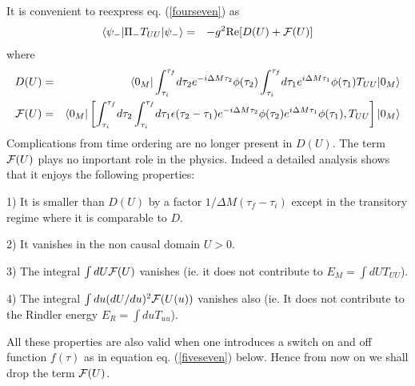 \documentclass[12pt,oneside]{report}
\def\elematrice#1#2#3{\langle #1|#2|#3 \rangle}
\begin{document}
It is convenient to reexpress  eq. (\ref{fourseven}) as
 \begin{eqnarray}
\elematrice{\psi_-} {\Pi_- T_{UU} }{\psi_-}
&=& 
- g^2 {\rm Re} [ D(U) + {\cal F}(U) ]
\label{fff}\end{eqnarray}
where
\begin{eqnarray}
 D(U)&=&
 \elematrice {0_M} { \int_{\tau_i}^{\tau_f} \! d\tau_2
e^{ -i \Delta M \tau_2} \phi(\tau_2) 
\int_{\tau_i}^{\tau_f} \! d\tau_1
e^{i \Delta M \tau_1} \phi(\tau_1)  T_{UU}}{0_M} \nonumber\\
{\cal F}(U)&=& 
\elematrice {0_M} { \left[ \int_{\tau_i}^{\tau_f} \! d\tau_2 
\int_{\tau_i}^{\tau_f} \! d\tau_1 \epsilon(\tau_2 - \tau_1)
e^{ -i \Delta M \tau_2} \phi(\tau_2) 
e^{i \Delta M \tau_1} \phi(\tau_1)  , T_{UU}\right]}{0_M}\nonumber\\
\label{foursevena}
\end{eqnarray}
Complications from time ordering are no longer present in $D(U)$. The term
${\cal F}(U)$ plays no important role in the physics. Indeed a detailed
analysis shows that it enjoys the following properties: 

1) It is smaller
than $D(U)$ by a factor $1/\Delta M 
(\tau_f - \tau_i)$ except in the transitory regime 
where it is comparable to $D$. 

2) It vanishes in the non
causal domain $U>0$. 

3) The integral $\int dU {\cal F}(U)$ vanishes (ie.
it does not contribute to $E_M = \int dU T_{UU}$). 

4) The integral $\int du
(dU / du)^2 {\cal F}(U(u))$ vanishes also
(ie. It does not contribute to the
Rindler energy $E_R = \int du T_{uu}$). 

All these properties are also valid
when one introduces a switch on and off 
function $f(\tau)$ as in equation  eq. (\ref{fiveseven})
below. Hence from now on we shall drop the term ${\cal F}(U)$.
\end{document}
